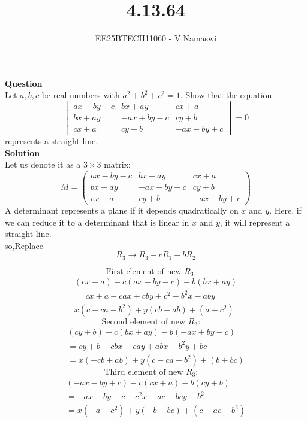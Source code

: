 \documentclass[journal]{IEEEtran}
\begin{document}

\vspace{3cm}

\title{4.13.64}
\author{EE25BTECH11060 - V.Namaswi}
{\let\newpage\relax\maketitle}
\renewcommand{\thefigure}{\theenumi}
\renewcommand{\thetable}{\theenumi}
\setlength{\intextsep}{10pt} %
\textbf{Question}\\
Let $a, b, c$ be real numbers with $a^2 + b^2 + c^2 = 1$. Show that the equation
\[
\begin{vmatrix}
ax - by - c & bx + ay & cx + a \\
bx + ay & -ax + by - c & cy + b \\
cx + a & cy + b & -ax - by + c
\end{vmatrix} = 0
\]
represents a straight line.\\
\textbf{Solution}\\
Let us denote it as a $3 \times 3$ matrix:
\[
M = 
\begin{pmatrix}
ax - by - c & bx + ay & cx + a \\
bx + ay & -ax + by - c & cy + b \\
cx + a & cy + b & -ax - by + c
\end{pmatrix}
\]
A determinant represents a plane if it depends quadratically on $x$ and $y$. Here, if we can reduce it to a determinant that is linear in $x$ and $y$, it will represent a straight line.\\
so,Replace
\[
R_3 \rightarrow R_3 - c R_1 - b R_2
\]

\[
\text{First element of new } R_3: \quad
\]
\begin{align}
(cx + a) - c(ax - by - c) - b(bx + ay)\\
= cx + a - cax + cby + c^2 - b^2 x - a b y\\
x(c - ca - b^2) + y(cb - ab) + (a + c^2)
\end{align}
\[
\text{Second element of new } R_3: \quad
\]
\begin{align}
(cy + b) - c(bx + ay) - b(-ax + by - c) \\
= cy + b - cbx - cay + abx - b^2 y + bc \\
= x(-cb + ab) + y(c - ca - b^2) + (b + bc)
\end{align}
 \[
\text{Third element of new } R_3: \quad
\]
\begin{align}
(-ax - by + c) - c(cx + a) - b(cy + b) \\
= -ax - by + c - c^2 x - ac - bcy - b^2 \\
= x(-a - c^2) + y(-b - bc) + (c - ac - b^2)
\end{align}
\end{document}
